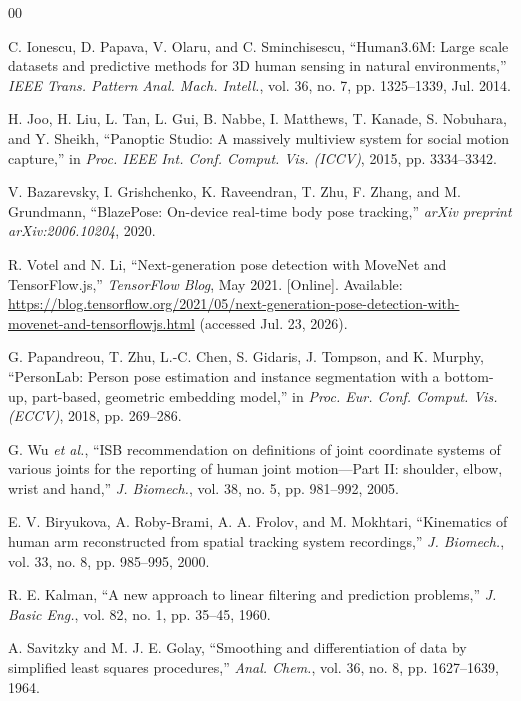 \documentclass[conference]{IEEEtran}
\begin{document}
\begin{thebibliography}{00}

C. Ionescu, D. Papava, V. Olaru, and C. Sminchisescu, ``Human3.6M: Large
scale datasets and predictive methods for 3D human sensing in natural
environments,'' \textit{IEEE Trans. Pattern Anal. Mach. Intell.}, vol.
36, no. 7, pp. 1325--1339, Jul. 2014.

H. Joo, H. Liu, L. Tan, L. Gui, B. Nabbe, I. Matthews, T. Kanade, S.
Nobuhara, and Y. Sheikh, ``Panoptic Studio: A massively multiview system
for social motion capture,'' in \textit{Proc. IEEE Int. Conf. Comput.
Vis. (ICCV)}, 2015, pp. 3334--3342.

V. Bazarevsky, I. Grishchenko, K. Raveendran, T. Zhu, F. Zhang, and M.
Grundmann, ``BlazePose: On-device real-time body pose tracking,''
\textit{arXiv preprint arXiv:2006.10204}, 2020.

R. Votel and N. Li, ``Next-generation pose detection with MoveNet and
TensorFlow.js,'' \textit{TensorFlow Blog}, May 2021. [Online]. Available:
\url{https://blog.tensorflow.org/2021/05/next-generation-pose-detection-with-movenet-and-tensorflowjs.html}
(accessed Jul. 23, 2026).

G. Papandreou, T. Zhu, L.-C. Chen, S. Gidaris, J. Tompson, and K. Murphy,
``PersonLab: Person pose estimation and instance segmentation with a
bottom-up, part-based, geometric embedding model,'' in \textit{Proc. Eur.
Conf. Comput. Vis. (ECCV)}, 2018, pp. 269--286.

G. Wu \textit{et al.}, ``ISB recommendation on definitions of joint
coordinate systems of various joints for the reporting of human joint
motion---Part II: shoulder, elbow, wrist and hand,'' \textit{J. Biomech.},
vol. 38, no. 5, pp. 981--992, 2005.

E. V. Biryukova, A. Roby-Brami, A. A. Frolov, and M. Mokhtari,
``Kinematics of human arm reconstructed from spatial tracking system
recordings,'' \textit{J. Biomech.}, vol. 33, no. 8, pp. 985--995, 2000.

R. E. Kalman, ``A new approach to linear filtering and prediction
problems,'' \textit{J. Basic Eng.}, vol. 82, no. 1, pp. 35--45, 1960.

A. Savitzky and M. J. E. Golay, ``Smoothing and differentiation of data
by simplified least squares procedures,'' \textit{Anal. Chem.}, vol. 36,
no. 8, pp. 1627--1639, 1964.


\end{thebibliography}
\end{document}
